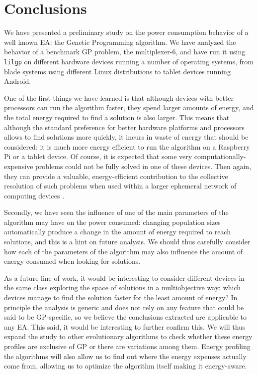\section{Conclusions}
\label{conclusions}

We have presented a preliminary study on the power consumption
behavior of a well known EA: the Genetic Programming algorithm.  We
have analyzed the behavior of a benchmark GP problem, the
multiplexer-6, and have run it using {\tt lilgp} on different
hardware devices running a number of operating systems, from blade
systems using different Linux distributions to tablet devices running
Android. 

One of the first things we have learned is that although devices with
better processors can run the algorithm faster, they spend
larger amounts of energy, and the total energy required to find a
solution is also larger.  This means that although the standard
preference for better hardware platforms and processors allows to find
solutions more quickly, it incurs in waste of energy that should be
considered:  it is much more energy efficient to run the algorithm on
a Raspberry Pi or a tablet device. Of course, it is expected that some very 
computationally-expensive problems could not be fully solved in one
of these devices. Then again, they can provide a valuable, energy-efficient
contribution to the collective resolution of such problems when used
within a larger ephemeral network of computing devices \cite{self}.

Secondly, we have seen the influence of one of the main parameters
of the algorithm may have on the power consumed:  changing population
sizes automatically produce a change in the amount of energy required to reach
solutions, and this is a hint on future analysis.  We should thus carefully
consider how each of the parameters of the algorithm may also
influence the amount of energy consumed when looking for solutions. 

As a future line of work, it would be interesting to consider
different devices in the same class exploring the space of
solutions in a multiobjective way: which devices manage to find the
solution faster for the least amount of energy?  In principle the analysis
is generic and does not rely on any 
feature that could be said to be GP-specific, so we believe the conclusions
extracted are applicable to any EA.  This said, it would be interesting to further confirm
this. We will thus expand the study
to other evolutionary algorithms to check whether these energy
profiles are exclusive of GP or there are variations
among them. Energy profiling the algorithms will also allow us to find
out where the energy expenses actually come from, allowing us to
optimize the algorithm itself making it energy-aware.